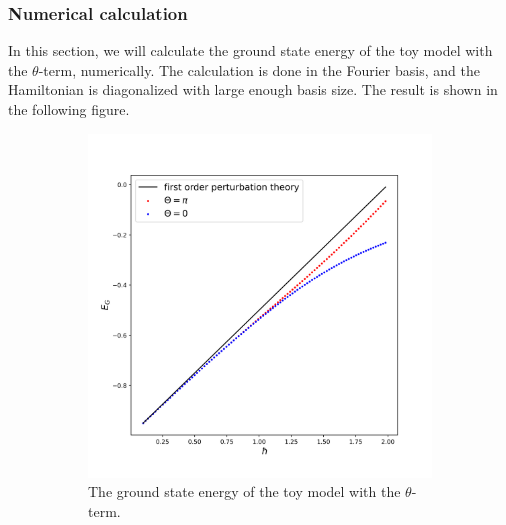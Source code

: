 \documentclass{article}
\begin{document}
\subsubsection{Numerical calculation}
In this section, we will calculate the ground state energy of the toy model with the $\theta$-term, numerically.
The calculation is done in the Fourier basis, and the Hamiltonian is diagonalized with large enough basis size.
The result is shown in the following figure.
\begin{figure}[]
    \centering
    \begin{subfigure}{0.5\textwidth}
        \centering
        \includegraphics[width=\textwidth]{E_G.png}
        \caption{The ground state energy of the toy model with the $\theta$-term.}
        \label{fig:E_G}
    \end{subfigure}
    \begin{subfigure}{0.5\textwidth}
        \centering

\end{subfigure}
\end{figure}
\end{document}
